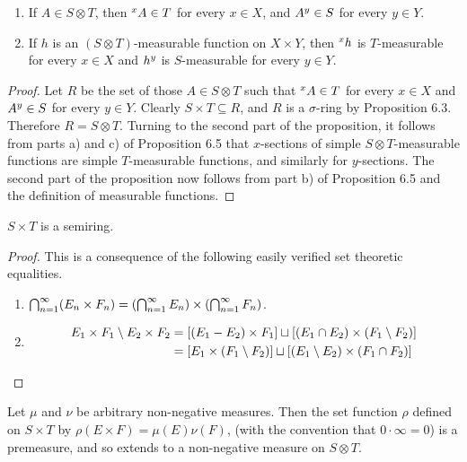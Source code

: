 \begin{proposition}
\begin{enumerate}
    \item If $A\in S\otimes T$, then $\xsec{A}{x}\in T$ for every $x\in X$, and $\ysec{A}{y}\in S$ for every $y\in Y$.
    
    \item If $h$ is an $(S\otimes T)$-measurable function on $X\times Y$, then $\xsec{h}{x}$ is $T$-measurable for every $x\in X$ and $\ysec{h}{y}$ is $S$-measurable for every $y\in Y$.
\end{enumerate}
\end{proposition}

\begin{proof}
Let $R$ be the set of those $A\in S\otimes T$ such that $\xsec{A}{x}\in T$ for every $x\in X$ and $\ysec{A}{y}\in S$ for every $y\in Y$. Clearly $S\times T\subseteq R$, and $R$ is a $\sigma$-ring by Proposition 6.3. Therefore $R=S\otimes T$. Turning to the second part of the proposition, it follows from parts a) and c) of Proposition 6.5 that $x$-sections of simple $S\otimes T$-measurable functions are simple $T$-measurable functions, and similarly for $y$-sections. The second part of the proposition now follows from part b) of Proposition 6.5 and the definition of measurable functions.
\end{proof}

\begin{lemma}
$S\times T$ is a semiring.
\end{lemma}

\begin{proof}
This is a consequence of the following easily verified set theoretic equalities.
\begin{enumerate}
    \item $\bigcap_{n=1}^\infty(E_n\times F_n)=\br{\bigcap_{n=1}^\infty E_n}\times\br{\bigcap_{n=1}^\infty F_n}$.
    
    \item
    \begin{align*}
        E_1\times F_1\sd E_2\times F_2&=\sbr{(E_1-E_2)\times F_1}\du[(E_1\cap E_2)\times(F_1\sd F_2)]\\
        &=[E_1\times(F_1\sd F_2)]\du[(E_1\sd E_2)\times(F_1\cap F_2)]
    \end{align*}
\end{enumerate}
\end{proof}

\begin{theorem}
Let $\mu$ and $\nu$ be arbitrary non-negative measures. Then the set function $\rho$ defined on $S\times T$ by $\rho(E\times F)=\mu(E)\nu(F)$, (with the convention that $0\cdot\infty=0$) is a premeasure, and so extends to a non-negative measure on $S\otimes T$.
\end{theorem}

